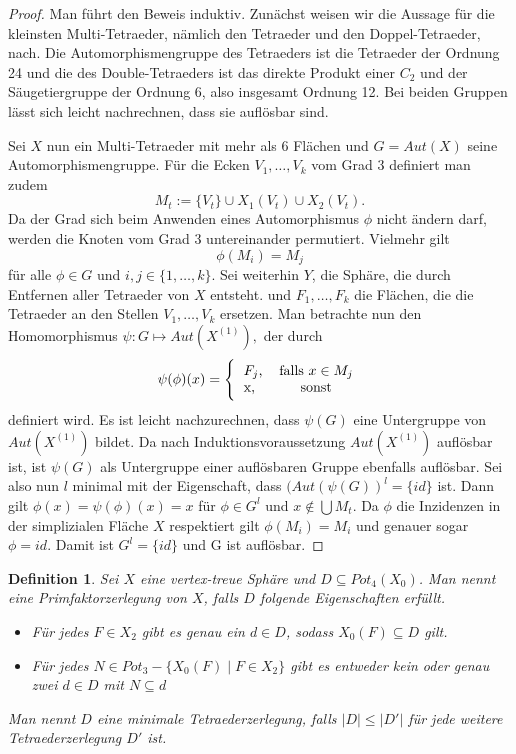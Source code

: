 \documentclass[12pt,titlepage,twoside,cleardoublepage]{article}
\theoremstyle{nummermitklammern}
\newtheorem{definition}[temp]{Definition}
\newtheorem{definition}[zahl]{Definition}
\numberwithin{equation}{section}
\begin{document}
\begin{proof}
Man führt den Beweis induktiv. Zunächst weisen wir die Aussage für die kleinsten Multi-Tetraeder, nämlich den Tetraeder und den Doppel-Tetraeder, nach. Die Automorphismengruppe des Tetraeders ist die Tetraeder  der Ordnung 24 und die des Double-Tetraeders ist das direkte Produkt einer $C_2$ und der Säugetiergruppe der Ordnung 6, also insgesamt Ordnung 12. Bei beiden Gruppen lässt sich leicht nachrechnen, dass sie auflösbar sind.

Sei $X$ nun ein Multi-Tetraeder mit mehr als  6 Flächen und $G=Aut(X)$ seine Automorphismengruppe. Für die Ecken $V_1,\ldots,V_k$ vom Grad $3$ definiert man zudem 
\[
M_t:=\{V_t\} \cup X_1(V_t) \cup X_2(V_t).  
\] 
Da der Grad sich beim Anwenden eines Automorphismus $\phi$ nicht ändern darf, werden die Knoten vom Grad 3 untereinander permutiert. Vielmehr gilt 
\[
\phi(M_i)=M_j 
\]
für alle $\phi \in G$ und $i,j\in \{1,\ldots,k\}.$ Sei weiterhin $Y$, die Sphäre, die durch Entfernen aller Tetraeder von $X$ entsteht. und $F_1,\ldots,F_k$ die Flächen, die die Tetraeder an den Stellen $V_1,\ldots,V_k$ ersetzen. Man betrachte nun den Homomorphismus $\psi:G\mapsto Aut(X^{(1)}),$ der durch  
\[
\psi(\phi)(x)=\Biggl\{
\begin{tabular}[l]{lcr}
$F_j$,&\textcolor{black}{ falls  $x\in M_j$} \\
x,& sonst\\
\end{tabular}
\]
definiert wird. Es ist leicht nachzurechnen, dass $\psi(G)$ eine Untergruppe von $Aut(X^{(1)})$ bildet. Da nach Induktionsvoraussetzung $Aut(X^{(1)})$ auflösbar ist, ist $\psi(G)$ als Untergruppe einer auflösbaren Gruppe ebenfalls auflösbar. 
Sei also nun $l$ minimal mit der Eigenschaft, dass $(Aut(\psi(G))^l=\{id\}$ ist. Dann gilt $\phi(x)=\psi(\phi)(x)=x$ für $\phi \in G^l$ und $x\notin \bigcup M_t$. Da $\phi$ die Inzidenzen in der simplizialen Fläche $X$ respektiert gilt $\phi(M_i)=M_i$ und genauer sogar $\phi=id.$ Damit ist $G^l =\{id\}$ und G ist auflösbar.
  
\end{proof}

\begin{definition}
Sei $X$ eine vertex-treue Sphäre und $D\subseteq Pot_4(X_0)$. Man nennt eine Primfaktorzerlegung von $X$, falls $D$ folgende Eigenschaften erfüllt.
\begin{itemize}
\item Für jedes $F\in X_2$ gibt es genau ein $d\in D$, sodass $X_0(F) \subseteq D$ gilt.
\item Für jedes $N\in Pot_3-\{X_0(F)\mid F\in X_2\}$ gibt es entweder kein oder genau zwei $d\in D$ mit $N\subseteq d$
\end{itemize}
Man nennt $D$ eine minimale Tetraederzerlegung, falls $\vert D \vert\leq \vert D' \vert$ für jede weitere Tetraederzerlegung $D'$ ist.
\end{definition}
\end{document}
